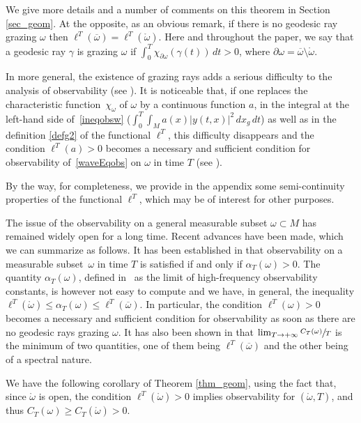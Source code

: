 \documentclass[10pt]{amsart}
\theoremstyle{definition}
\begin{document}
We give more details and a number of comments on this theorem in Section \ref{sec_geom}. At the opposite, as an obvious remark, if there is no geodesic ray {grazing} $\omega$ then $\ell^T(\overline\omega)=\ell^T(\mathring{\omega})$. {Here and throughout the paper, we say that a geodesic ray $\gamma$ is grazing $\omega$ if $\int_0^T\chi_{\partial\omega}(\gamma(t))\, dt>0$, where $\partial\omega=\overline\omega\setminus\mathring{\omega}$.}

In more general, the existence of grazing rays adds a serious difficulty to the analysis of observability (see \cite{BardosLebeauRauch}). It is noticeable that, if one replaces the characteristic function~$\chi_\omega$ of $\omega$ by a continuous function $a$, in the integral at the left-hand side of~\eqref{ineqobsw} (\ie $\int_0^T\int_M a(x)\vert y(t,x)\vert^2\, dx_g\, dt$) as well as in the definition \eqref{defg2} of the functional $\ell^T$, this difficulty disappears and the condition $\ell^T(a)>0$ becomes a necessary and sufficient condition for observability of~\eqref{waveEqobs} on $\omega$ in time $T$ (see \cite{BurqGerard1997}).

By the way, for completeness, we provide in the appendix some semi-continuity properties of the functional $\ell^T$, which may be of interest for other purposes.

The issue of the observability on a general measurable subset $\omega\subset M$ has remained widely open for a long time. Recent advances have been made, which we can summarize as follows. It has been established in \cite{hpt} that observability on a measurable subset~$\omega$ in time $T$ is satisfied if and only if $\alpha_T(\omega)>0$. The quantity $\alpha_T(\omega)$, defined in~\cite{hpt} as the limit of high-frequency observability constants, is however not easy to compute and we have, in general, the inequality $\ell^T(\mathring{\omega}) \leq \alpha_T(\omega) \leq \ell^T(\overline\omega)$. In particular, the condition $\ell^T(\omega)>0$ becomes a necessary and sufficient condition for observability as soon as there are no geodesic rays grazing $\omega$.
It has also been shown in \cite{hpt} that $\lim_{T \to+ \infty}\sfrac{C_T(\omega)}{T}$ is the minimum of two quantities, one of them being $\ell^T(\overline\omega)$ and the other being of a spectral nature.

We have the following corollary of Theorem \ref{thm_geom}, using the fact that, since $\mathring{\omega}$ is open, the condition $\ell^T(\mathring{\omega})>0$ implies observability for $(\mathring{\omega},T)$, and thus $C_T(\omega)\geq C_T(\mathring{\omega})>0$.
\end{document}
